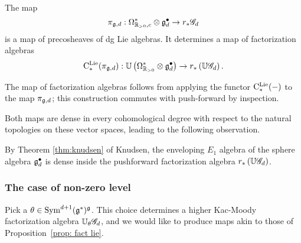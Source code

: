 \begin{prop}
\label{prop: fact lie}
The map
\[
\pi_{\mathfrak g, d}: \Omega^*_{\mathbb R_{>0},c} \otimes \mathfrak g^\bullet_d \to r_*\mathscr G_d 
\] 
is a map of precosheaves of dg Lie algebras.
It determines a map of factorization algebras
\[
{\rm C}^{\rm Lie}_*(\pi_{\mathfrak g, d}) : \mathbb U\left(\Omega^{*}_{\mathbb R_{>0}} \otimes \mathfrak g^\bullet_d\right) \to r_*\left(\mathbb U \mathscr G_d \right) .
\]
\end{prop}

The map of factorization algebras follows from applying the functor ${\rm C}^{\rm Lie}_*(-)$ to the map $\pi_{\mathfrak g, d}$;
this construction commutes with push-forward by inspection. 

Both maps are dense in every cohomological degree with respect to the natural topologies on these vector spaces,
leading to the following observation.


\begin{cor}
By Theorem \ref{thm:knudsen} of Knudsen, 
the enveloping $E_1$ algebra of the sphere algebra $\mathfrak g^\bullet_d$ is dense inside the pushforward factorization algebra $r_*\left(\mathbb U \mathscr G_d \right)$.
\end{cor}

\subsubsection{The case of non-zero level}

Pick a $\theta \in {\rm Sym}^{d+1}(\mathfrak g^*)^\mathfrak g$. 
This choice determines a higher Kac-Moody factorization algebra $\mathbb U_\theta \mathscr G_d$,
and we would like to produce maps akin to those of Proposition~\ref{prop: fact lie}.

